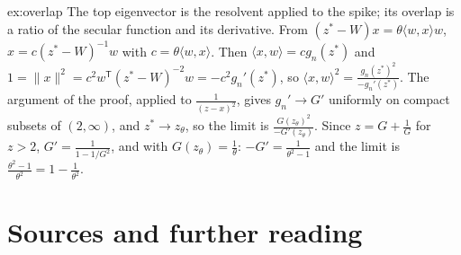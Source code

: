 \begin{solution}{ex:overlap}
\idea The top eigenvector is the resolvent applied to the spike; its overlap is a ratio of the secular function and its derivative.
\writeup From $(z^*-W)x=\theta\langle w,x\rangle w$, $x=c(z^*-W)^{-1}w$ with $c=\theta\langle w,x\rangle$. Then $\langle x,w\rangle=cg_n(z^*)$ and $1=\|x\|^2=c^2w^{\mathsf T}(z^*-W)^{-2}w=-c^2g_n'(z^*)$, so
$\langle x,w\rangle^2=\frac{g_n(z^*)^2}{-g_n'(z^*)}$. The argument of the proof, applied to $\frac1{(z-x)^2}$, gives $g_n'\to G'$ uniformly on compact subsets of $(2,\infty)$, and $z^*\to z_\theta$, so the limit is
$\frac{G(z_\theta)^2}{-G'(z_\theta)}$. Since $z=G+\frac1G$ for $z>2$, $G'=\frac1{1-1/G^2}$, and with $G(z_\theta)=\frac1\theta$: $-G'=\frac1{\theta^2-1}$ and the limit is $\frac{\theta^2-1}{\theta^2}=1-\frac1{\theta^2}$.
\end{solution}

\section*{Sources and further reading}


